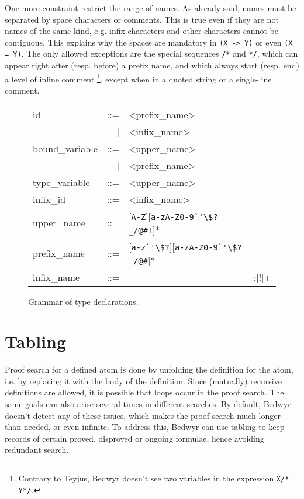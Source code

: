 One more constraint restrict the range of names.  As already said, names
must be separated by space characters or comments.  This is true even if
they are not names of the same kind, e.g. infix characters and other
characters cannot be contiguous.  This explains why the spaces are
mandatory in \lstinline{(X -> Y)} or even \lstinline{(X = Y)}.  The only
allowed exceptions are the special sequences \lstinline{/*} and
\lstinline{*/}, which can appear right after (resp. before) a prefix
name, and which always start (resp. end) a level of inline comment%
\footnote{Contrary to Teyjus, Bedwyr doesn't see two variables in the
  expression \lstinline{X/* Y*/}.
}, except when in a quoted string or a single-line comment.

\begin{figure}
  \centering
  \begin{tabular}{lrll}
    id                &::=& <prefix\_name> \\
                      & | & <infix\_name> \\
    bound\_variable   &::=& <upper\_name> \\
                      & | & <prefix\_name> \\
    type\_variable    &::=& <upper\_name> \\
    infix\_id         &::=& <infix\_name> \\

    upper\_name       &::=&
              [\lstinline!A-Z!][\lstinline+a-zA-Z0-9`'\$?_/@#!+]* \\
    prefix\_name      &::=&
              [\lstinline!a-z`'\$?!][\lstinline+a-zA-Z0-9`'\$?_/@#+]* \\
    infix\_name       &::=& [\lstinline!-^<>=~+*&:|!]+ \\
  \end{tabular}
  \caption{Grammar of type declarations.\label{bnf:tokens}}
\end{figure}


\section{Tabling}
\label{tabling}

Proof search for a defined atom is done by unfolding the definition for
the atom, i.e. by replacing it with the body of the definition.  Since
(mutually) recursive definitions are allowed, it is possible that loops
occur in the proof search.  The same goals can also arise several times
in different searches.  By default, Bedwyr doesn't detect any of these
issues, which makes the proof search much longer than needed, or even
infinite.  To address this, Bedwyr can use tabling to keep records of
certain proved, disproved or ongoing formulae, hence avoiding redundant
search.

